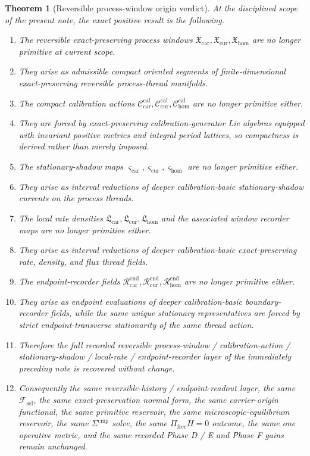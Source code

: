 \documentclass[11pt]{article}
\newcommand{\StemFunctional}{\mathscr F_{\mathrm{sel}}}
\newcommand{\TensorWindowClass}{\mathfrak X_{\mathrm{car}}}
\newcommand{\CurWindowClass}{\mathfrak X_{\mathrm{cur}}}
\newcommand{\HomWindowClass}{\mathfrak X_{\mathrm{hom}}}
\newcommand{\TensorCalGroup}{\mathcal C_{\mathrm{car}}^{\mathrm{cal}}}
\newcommand{\CurCalGroup}{\mathcal C_{\mathrm{cur}}^{\mathrm{cal}}}
\newcommand{\HomCalGroup}{\mathcal C_{\mathrm{hom}}^{\mathrm{cal}}}
\newcommand{\TensorStatTag}{\varsigma_{\mathrm{car}}}
\newcommand{\CurStatTag}{\varsigma_{\mathrm{cur}}}
\newcommand{\HomStatTag}{\varsigma_{\mathrm{hom}}}
\newcommand{\TensorLocalRate}{\mathfrak L_{\mathrm{car}}}
\newcommand{\CurLocalRate}{\mathfrak L_{\mathrm{cur}}}
\newcommand{\HomLocalRate}{\mathfrak L_{\mathrm{hom}}}
\newcommand{\TensorEndpointReadSeed}{\mathscr R_{\mathrm{car}}^{\mathrm{end}}}
\newcommand{\CurEndpointReadSeed}{\mathscr R_{\mathrm{cur}}^{\mathrm{end}}}
\newcommand{\HomEndpointReadSeed}{\mathscr R_{\mathrm{hom}}^{\mathrm{end}}}
\newtheorem{theorem}{Theorem}
\begin{document}
\begin{theorem}[Reversible process-window origin verdict]
\label{thm:verdict}
At the disciplined scope of the present note, the exact positive result is the following.
\begin{enumerate}
    \item The reversible exact-preserving process windows \(\TensorWindowClass,\CurWindowClass,\HomWindowClass\) are no longer primitive at current scope.
    \item They arise as admissible compact oriented segments of finite-dimensional exact-preserving reversible process-thread manifolds.
    \item The compact calibration actions \(\TensorCalGroup,\CurCalGroup,\HomCalGroup\) are no longer primitive either.
    \item They are forced by exact-preserving calibration-generator Lie algebras equipped with invariant positive metrics and integral period lattices, so compactness is derived rather than merely imposed.
    \item The stationary-shadow maps \(\TensorStatTag,\CurStatTag,\HomStatTag\) are no longer primitive either.
    \item They arise as interval reductions of deeper calibration-basic stationary-shadow currents on the process threads.
    \item The local rate densities \(\TensorLocalRate,\CurLocalRate,\HomLocalRate\) and the associated window recorder maps are no longer primitive either.
    \item They arise as interval reductions of deeper calibration-basic exact-preserving rate, density, and flux thread fields.
    \item The endpoint-recorder fields \(\TensorEndpointReadSeed,\CurEndpointReadSeed,\HomEndpointReadSeed\) are no longer primitive either.
    \item They arise as endpoint evaluations of deeper calibration-basic boundary-recorder fields, while the same unique stationary representatives are forced by strict endpoint-transverse stationarity of the same thread action.
    \item Therefore the full recorded reversible process-window / calibration-action / stationary-shadow / local-rate / endpoint-recorder layer of the immediately preceding note is recovered without change.
    \item Consequently the same reversible-history / endpoint-readout layer, the same \(\StemFunctional\), the same exact-preservation normal form, the same carrier-origin functional, the same primitive reservoir, the same microscopic-equilibrium reservoir, the same \(\Sigma^{\mathrm{cmp}}\) solve, the same \(\Pi_{\mathrm{free}}H=0\) outcome, the same one operative metric, and the same recorded Phase D / E and Phase F gains remain unchanged.

\end{enumerate}
\end{theorem}
\end{document}
